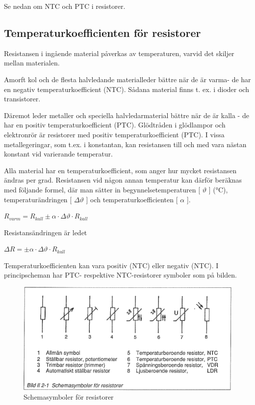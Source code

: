 Se nedan om NTC och PTC i resistorer.

\subsection{Temperaturkoefficienten för resistorer}

Resistansen i ingående material påverkas av temperaturen, varvid det skiljer
mellan materialen.

Amorft kol och de flesta halvledande materialleder bättre när de är varma- de
har en negativ temperaturkoefficient (NTC). Sådana material finns t. ex. i
dioder och transistorer.

Däremot leder metaller och speciella halvledarmaterial bättre när de är kalla -
de har en positiv temperaturkoefficient (PTC). Glödtråden i glödlampor och
elektronrör är resistorer med positiv temperaturkoefficient (PTC). I vissa
metallegeringar, som t.ex. i konstantan, kan resistansen till och med vara
nästan konstant vid varierande temperatur.

Alla material har en temperaturkoefficient, som anger hur mycket resistansen
ändras per grad. Resistansen vid någon annan temperatur kan därför beräknas med
följande formel, där man sätter in begynnelsetemperaturen [ \(\vartheta\) ]
(°C), temperaturändringen [ \(\Delta \vartheta\) ] och
temperaturkoefficienten [ \(\alpha\) ].

\(R_{varm} = R_{kall} \pm \alpha \cdot \Delta \vartheta \cdot R_{kall}\)

Resistansändringen är ledet

\( \Delta R = \pm \alpha \cdot \Delta \vartheta \cdot R_{kall}\)

Temperaturkoefficienten kan vara positiv (NTC) eller negativ (NTC).
I principscheman har PTC- respektive NTC-resistorer symboler som på bilden.

\begin{figure}
\includegraphics[width=\textwidth]{images/bild_2_2-01}
\caption{Schemasymboler för resistorer}
\label{fig:BildII2-1}
\end{figure}

